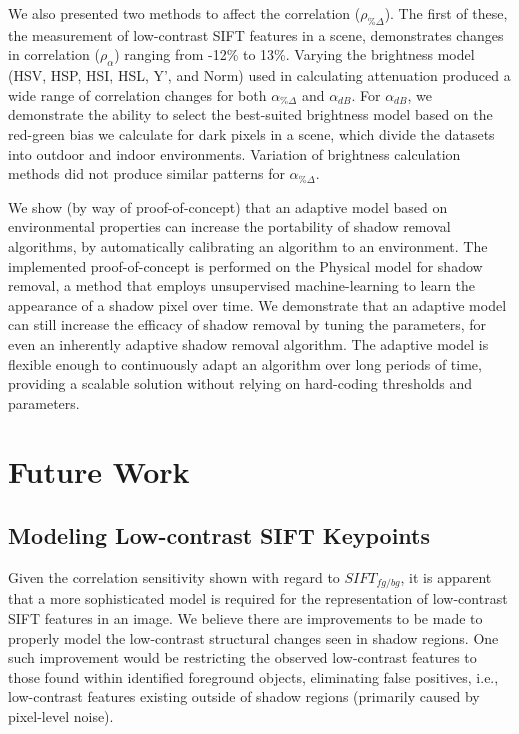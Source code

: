 We also presented two methods to affect the correlation ($\rho_{\%\Delta}$). The first of these, the measurement of low-contrast SIFT features in a scene, demonstrates changes in correlation ($\rho_{\alpha}$) ranging from -12\% to 13\%. Varying the brightness model (HSV, HSP, HSI, HSL, Y', and Norm) used in calculating attenuation produced a wide range of correlation changes for both $\alpha_{\%\Delta}$ and $\alpha_{dB}$. For $\alpha_{dB}$, we demonstrate the ability to select the best-suited brightness model based on the red-green bias we calculate for dark pixels in a scene, which divide the datasets into outdoor and indoor environments. Variation of brightness calculation methods did not produce similar patterns for $\alpha_{\%\Delta}$.

We show (by way of proof-of-concept) that an adaptive model based on environmental properties can increase the portability of shadow removal algorithms, by automatically calibrating an algorithm to an environment. The implemented proof-of-concept is performed on the Physical model for shadow removal, a method that employs unsupervised machine-learning to learn the appearance of a shadow pixel over time. We demonstrate that an adaptive model can still increase the efficacy of shadow removal by tuning the parameters, for even an inherently adaptive shadow removal algorithm. The adaptive model is flexible enough to continuously adapt an algorithm over long periods of time, providing a scalable solution without relying on hard-coding thresholds and parameters. 

\section{Future Work}

\subsection{Modeling Low-contrast SIFT Keypoints}

Given the correlation sensitivity shown with regard to $SIFT_{fg/bg}$, it is apparent that a more sophisticated model is required for the representation of low-contrast SIFT features in an image. We believe there are improvements to be made to properly model the low-contrast structural changes seen in shadow regions. One such improvement would be restricting the observed low-contrast features to those found within identified foreground objects, eliminating false positives, i.e., low-contrast features existing outside of shadow regions (primarily caused by pixel-level noise).

